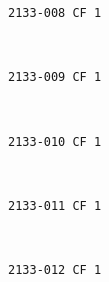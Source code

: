 \documentclass[11pt]{article}
\begin{document}
    \begin{Verbatim}[commandchars=\\\{\}]
2133-008 CF 1

    \end{Verbatim}

    \begin{center}
    \end{center}
    { \hspace*{\fill} \\}
    
    \begin{Verbatim}[commandchars=\\\{\}]
2133-009 CF 1

    \end{Verbatim}

    \begin{center}
    \end{center}
    { \hspace*{\fill} \\}
    
    \begin{Verbatim}[commandchars=\\\{\}]
2133-010 CF 1

    \end{Verbatim}

    \begin{center}
    \end{center}
    { \hspace*{\fill} \\}
    
    \begin{Verbatim}[commandchars=\\\{\}]
2133-011 CF 1

    \end{Verbatim}

    \begin{center}
    \end{center}
    { \hspace*{\fill} \\}
    
    \begin{Verbatim}[commandchars=\\\{\}]
2133-012 CF 1

    \end{Verbatim}
\end{document}
